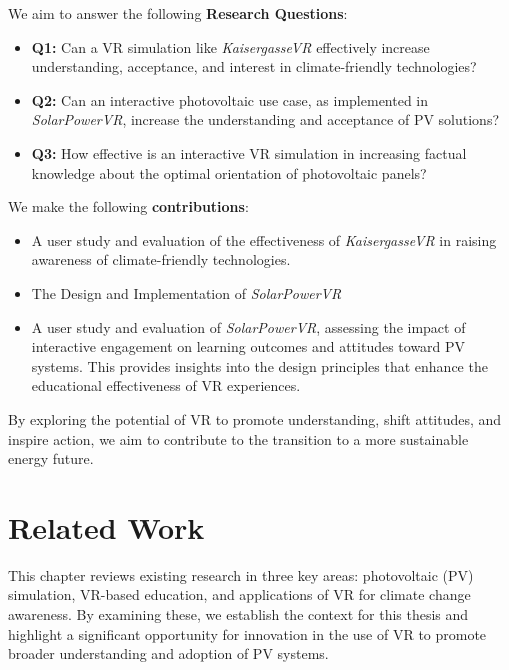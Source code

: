 \documentclass[draft, final]{vutinfth} %
\begin{document}
We aim to answer the following \textbf{Research Questions}:
\begin{itemize}
    \item \textbf{Q1:} Can a VR simulation like \textit{KaisergasseVR} effectively increase understanding, acceptance, and interest in climate-friendly technologies?
    \item \textbf{Q2:} Can an interactive photovoltaic use case, as implemented in \textit{SolarPowerVR}, increase the understanding and acceptance of PV solutions?
    \item \textbf{Q3:} How effective is an interactive VR simulation in increasing factual knowledge about the optimal orientation of photovoltaic panels?
\end{itemize}

We make the following \textbf{contributions}:
\begin{itemize}
    \item A user study and evaluation of the effectiveness of \textit{KaisergasseVR} in raising awareness of climate-friendly technologies.
    \item The Design and Implementation of \textit{SolarPowerVR}
    \item A user study and evaluation of \textit{SolarPowerVR}, assessing the impact of interactive engagement on learning outcomes and attitudes toward PV systems. This provides insights into the design principles that enhance the educational effectiveness of VR experiences.
\end{itemize}

By exploring the potential of VR to promote understanding, shift attitudes, and inspire action, we aim to contribute to the transition to a more sustainable energy future.

\chapter{Related Work}

This chapter reviews existing research in three key areas: photovoltaic (PV) simulation, VR-based education, and applications of VR for climate change awareness. By examining these, we establish the context for this thesis and highlight a significant opportunity for innovation in the use of VR to promote broader understanding and adoption of PV systems.
\end{document}
